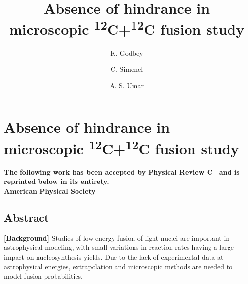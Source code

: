 
\chapter{Absence of hindrance in microscopic \textsuperscript{12}C+\textsuperscript{12}C fusion study}\label{chapters:chapter_6}

\title{Absence of hindrance in microscopic \textsuperscript{12}C+\textsuperscript{12}C fusion study}

\author[1]{K. Godbey}



\author[2]{C. Simenel}

\author[1]{A. S. Umar}

{

	\makeatletter

	\begin{center}
		\AB@authlist
		\AB@affillist
	\end{center}
	\makeatother
	
		\bfseries\centering
	The following work has been accepted by Physical Review C~\citep{godbey2019b} and is reprinted below in its entirety.\\
	 American Physical Society\\
}
\makeatletter
\renewcommand{\AB@affillist}{}
\renewcommand{\AB@authlist}{}
\setcounter{authors}{0}
\makeatother

\section{Abstract}
	\edef\oldrightskip{\the\rightskip}

		\rightskip\oldrightskip\relax
		\setlength{\parskip}{0pt}
		
		{\bf [Background]} Studies of low-energy fusion of light nuclei are important in astrophysical modeling, with small variations in reaction rates having a large impact on nucleosynthesis yields. Due to the lack of experimental data at astrophysical energies, extrapolation and microscopic methods are needed to model fusion probabilities.
		
